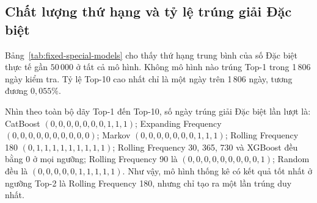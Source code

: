 \subsection{Chất lượng thứ hạng và tỷ lệ trúng giải Đặc biệt}
Bảng~\ref{tab:fixed-special-models} cho thấy thứ hạng trung bình của số Đặc biệt thực tế gần $50\,000$ ở tất cả mô hình. Không mô hình nào trúng Top-1 trong 1\,806 ngày kiểm tra. Tỷ lệ Top-10 cao nhất chỉ là một ngày trên 1\,806 ngày, tương đương $0,055\%$.

\begin{table}[H]
	\centering\small
	\caption{Thứ hạng và tỷ lệ trúng giải Đặc biệt trên tập kiểm tra 2021--2025}
	\label{tab:fixed-special-models}
\end{table}

Nhìn theo toàn bộ dãy Top-1 đến Top-10, số ngày trúng giải Đặc biệt lần lượt là: CatBoost $(0,0,0,0,0,0,0,1,1,1)$; Expanding Frequency $(0,0,0,0,0,0,0,0,0,0)$; Markov $(0,0,0,0,0,0,0,1,1,1)$; Rolling Frequency 180 $(0,1,1,1,1,1,1,1,1,1)$; Rolling Frequency 30, 365, 730 và XGBoost đều bằng 0 ở mọi ngưỡng; Rolling Frequency 90 là $(0,0,0,0,0,0,0,0,0,1)$; Random đều là $(0,0,0,0,0,1,1,1,1,1)$. Như vậy, mô hình thống kê có kết quả tốt nhất ở ngưỡng Top-2 là Rolling Frequency 180, nhưng chỉ tạo ra một lần trúng duy nhất.

